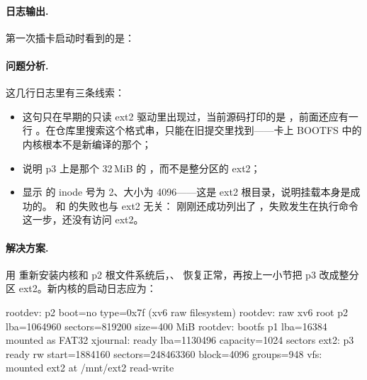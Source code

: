 \paragraph{日志输出.} 第一次插卡启动时看到的是：


\paragraph{问题分析.} 这几行日志里有三条线索：

\begin{itemize}
  \item {} 这句只在早期的只读 ext2 驱动里出现过，当前源码打印的是 ，前面还应有一行 。在仓库里搜索这个格式串，只能在旧提交里找到——卡上 BOOTFS 中的内核根本不是新编译的那个；
  \item {} 说明 p3 上是那个 32\,MiB 的 ，而不是整分区的 ext2；
  \item {} 显示  的 inode 号为 2、大小为 4096——这是 ext2 根目录，说明挂载本身是成功的。 和  的失败也与 ext2 无关： 刚刚还成功列出了 ，失败发生在执行命令这一步，还没有访问 ext2。
\end{itemize}

\paragraph{解决方案.} 用  重新安装内核和 p2 根文件系统后，、 恢复正常，再按上一小节把 p3 改成整分区 ext2。新内核的启动日志应为：

\begin{txtcode}
rootdev: p2 boot=no type=0x7f (xv6 raw filesystem)
rootdev: raw xv6 root p2 lba=1064960 sectors=819200 size=400 MiB
rootdev: bootfs p1 lba=16384 mounted as FAT32
xjournal: ready lba=1130496 capacity=1024 sectors
ext2: p3 ready rw start=1884160 sectors=248463360 block=4096 groups=948
vfs: mounted ext2 at /mnt/ext2 read-write
\end{txtcode}

